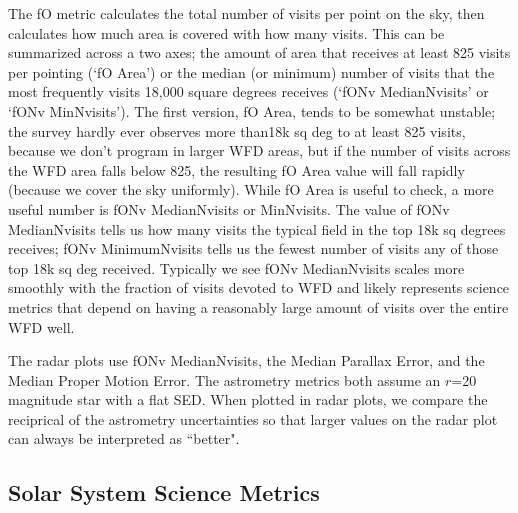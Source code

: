 The fO metric calculates the total number of visits per point on the sky, then calculates how much area is covered with how many visits. This can be summarized across a two axes; the amount of area that receives at least 825 visits per pointing (`fO Area') or the median (or minimum) number of visits that the most frequently visits 18,000 square degrees receives (`fONv MedianNvisits' or `fONv MinNvisits'). The first version, fO Area, tends to be somewhat unstable; the survey hardly ever observes more than18k sq deg to at least 825 visits, because we don't program in larger WFD areas, but if the number of visits across the WFD area falls below 825, the resulting fO Area value will fall rapidly (because we cover the sky uniformly). While fO Area is useful to check, a more useful number is fONv MedianNvisits or MinNvisits. The value of fONv MedianNvisits tells us how many visits the typical field in the top 18k sq degrees receives; fONv MinimumNvisits tells us the fewest number of visits any of those top 18k sq deg received. Typically we see fONv MedianNvisits scales more smoothly with the fraction of visits devoted to WFD and likely represents science metrics that depend on having a reasonably large amount of visits over the entire WFD well. 

The radar plots use fONv MedianNvisits, the Median Parallax Error, and the Median Proper Motion Error. The astrometry metrics both assume an $r$=20 magnitude star with a flat SED. When plotted in radar plots, we compare the reciprical of the astrometry uncertainties so that larger values on the radar plot can always be interpreted as ``better".

\subsection{Solar System Science Metrics}


